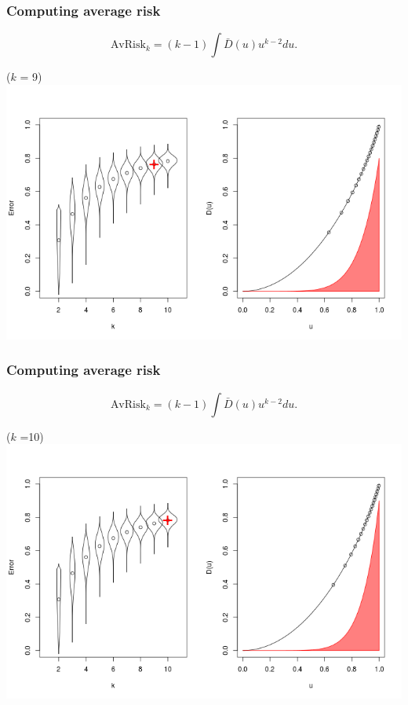 \documentclass{beamer}
\begin{document}
\begin{frame}
\frametitle{Computing average risk}
\[
\text{AvRisk}_k = (k-1) \int \bar{D}(u) u^{k-2} du.
\]
\begin{center}
($k$ = 9)
\includegraphics[scale = 0.4, clip=true, trim=0 0.1in 0 0.7in]{../extrapolation/rho_0_7_fmla9.png}
\end{center}
\end{frame}

\begin{frame}
\frametitle{Computing average risk}
\[
\text{AvRisk}_k = (k-1) \int \bar{D}(u) u^{k-2} du.
\]
\begin{center}
($k$ {\tiny =}\hspace{0.025in}10)
\includegraphics[scale = 0.4, clip=true, trim=0 0.1in 0 0.7in]{../extrapolation/rho_0_7_fmla10.png}
\end{center}
\end{frame}
\end{document}
